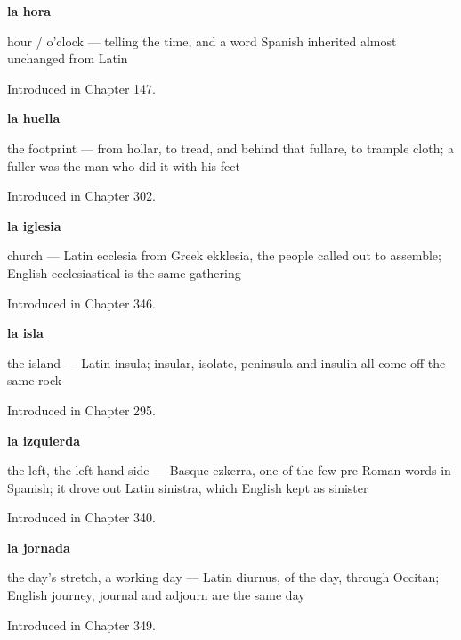 \noindent\begin{minipage}[t]{\linewidth}
\raggedright
\textbf{la hora}\par
\small hour / o'clock — telling the time, and a word Spanish inherited almost unchanged from Latin\par
\footnotesize Introduced in Chapter 147.
\end{minipage}\par\medskip

\noindent\begin{minipage}[t]{\linewidth}
\raggedright
\textbf{la huella}\par
\small the footprint — from hollar, to tread, and behind that fullare, to trample cloth; a fuller was the man who did it with his feet\par
\footnotesize Introduced in Chapter 302.
\end{minipage}\par\medskip

\noindent\begin{minipage}[t]{\linewidth}
\raggedright
\textbf{la iglesia}\par
\small church — Latin ecclesia from Greek ekklesia, the people called out to assemble; English ecclesiastical is the same gathering\par
\footnotesize Introduced in Chapter 346.
\end{minipage}\par\medskip

\noindent\begin{minipage}[t]{\linewidth}
\raggedright
\textbf{la isla}\par
\small the island — Latin insula; insular, isolate, peninsula and insulin all come off the same rock\par
\footnotesize Introduced in Chapter 295.
\end{minipage}\par\medskip

\noindent\begin{minipage}[t]{\linewidth}
\raggedright
\textbf{la izquierda}\par
\small the left, the left-hand side — Basque ezkerra, one of the few pre-Roman words in Spanish; it drove out Latin sinistra, which English kept as sinister\par
\footnotesize Introduced in Chapter 340.
\end{minipage}\par\medskip

\noindent\begin{minipage}[t]{\linewidth}
\raggedright
\textbf{la jornada}\par
\small the day's stretch, a working day — Latin diurnus, of the day, through Occitan; English journey, journal and adjourn are the same day\par
\footnotesize Introduced in Chapter 349.
\end{minipage}\par\medskip

